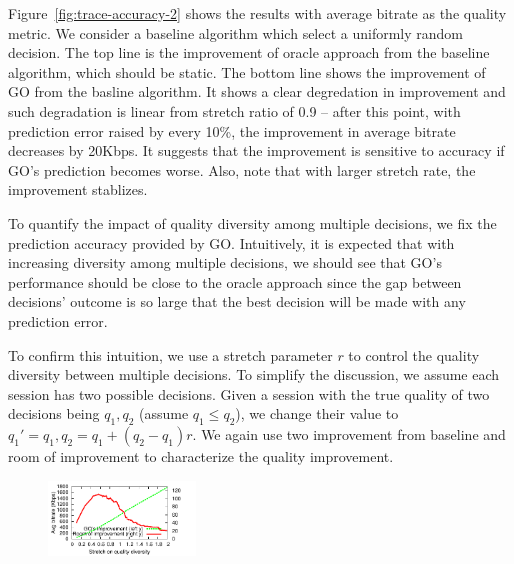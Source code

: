 Figure~\ref{fig:trace-accuracy-2} shows the results with average bitrate as the quality metric. We consider a baseline algorithm which select a uniformly random decision. The top line is the improvement of oracle approach from the baseline algorithm, which should be static. The bottom line shows the improvement of GO from the basline algorithm. 
It shows a clear degredation in improvement and such degradation is linear from stretch ratio of 0.9 -- after this point, with prediction error raised by every 10\%, the improvement in average bitrate decreases by 20Kbps. It suggests that the improvement is sensitive to accuracy if GO's prediction becomes worse. Also, note that with larger stretch rate, the improvement stablizes.





To quantify the impact of quality diversity among multiple decisions, we fix the prediction accuracy provided by GO. Intuitively, it is expected that with increasing diversity among multiple decisions, we should see that GO's performance should be close to the oracle approach since the gap between decisions' outcome is so large that the best decision will be made with any prediction error. 

To confirm this intuition, we use a stretch parameter $r$ to control the quality diversity between multiple decisions. To simplify the discussion, we assume each session has two possible decisions. Given a session with the true quality of two decisions being $q_1, q_2$ (assume $q_1\leq q_2$), we change their value to $q_1'=q_1, q_2=q_1+(q_2-q_1)r$. We again use two improvement from baseline and room of improvement to characterize the quality improvement.

\begin{figure}[h!]
\centering
\includegraphics[width=0.35\textwidth] {figures/newfig/trendDiversity-metricId1-keyGlobal-partition.pdf}
\label{fig:trace-diversity}
\end{figure}

